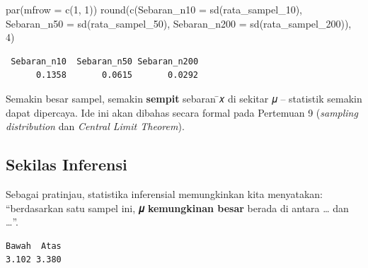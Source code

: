 \documentclass[
  indonesian,
  letterpaper,
]{book}
\newenvironment{Shaded}{\begin{snugshade}}{\end{snugshade}}
\newcommand{\AttributeTok}[1]{\textcolor[rgb]{0.40,0.45,0.13}{#1}}
\newcommand{\DecValTok}[1]{\textcolor[rgb]{0.68,0.00,0.00}{#1}}
\newcommand{\FunctionTok}[1]{\textcolor[rgb]{0.28,0.35,0.67}{#1}}
\newcommand{\NormalTok}[1]{\textcolor[rgb]{0.00,0.23,0.31}{#1}}
\newcommand{\OtherTok}[1]{\textcolor[rgb]{0.00,0.23,0.31}{#1}}
\newcommand{\SpecialCharTok}[1]{\textcolor[rgb]{0.37,0.37,0.37}{#1}}
\begin{document}
\begin{Shaded}
\begin{Highlighting}[]
\FunctionTok{par}\NormalTok{(}\AttributeTok{mfrow =} \FunctionTok{c}\NormalTok{(}\DecValTok{1}\NormalTok{, }\DecValTok{1}\NormalTok{))}
\FunctionTok{round}\NormalTok{(}\FunctionTok{c}\NormalTok{(}\AttributeTok{Sebaran\_n10 =} \FunctionTok{sd}\NormalTok{(rata\_sampel\_10), }\AttributeTok{Sebaran\_n50 =} \FunctionTok{sd}\NormalTok{(rata\_sampel\_50),}
\AttributeTok{Sebaran\_n200 =} \FunctionTok{sd}\NormalTok{(rata\_sampel\_200)), }\DecValTok{4}\NormalTok{)}
\end{Highlighting}
\end{Shaded}

\begin{verbatim}
 Sebaran_n10  Sebaran_n50 Sebaran_n200 
      0.1358       0.0615       0.0292 
\end{verbatim}

Semakin besar sampel, semakin \textbf{sempit} sebaran ̄𝑥 di sekitar 𝜇 --
statistik semakin dapat dipercaya. Ide ini akan dibahas secara formal
pada Pertemuan 9 (\emph{sampling distribution} dan \emph{Central Limit
Theorem}).

\subsection{Sekilas Inferensi}\label{sekilas-inferensi}

Sebagai pratinjau, statistika inferensial memungkinkan kita menyatakan:
``berdasarkan satu sampel ini, \textbf{𝜇 kemungkinan besar} berada di
antara \ldots{} dan \ldots''.

\begin{Shaded}
\end{Shaded}

\begin{verbatim}
Bawah  Atas 
3.102 3.380 
\end{verbatim}
\end{document}
